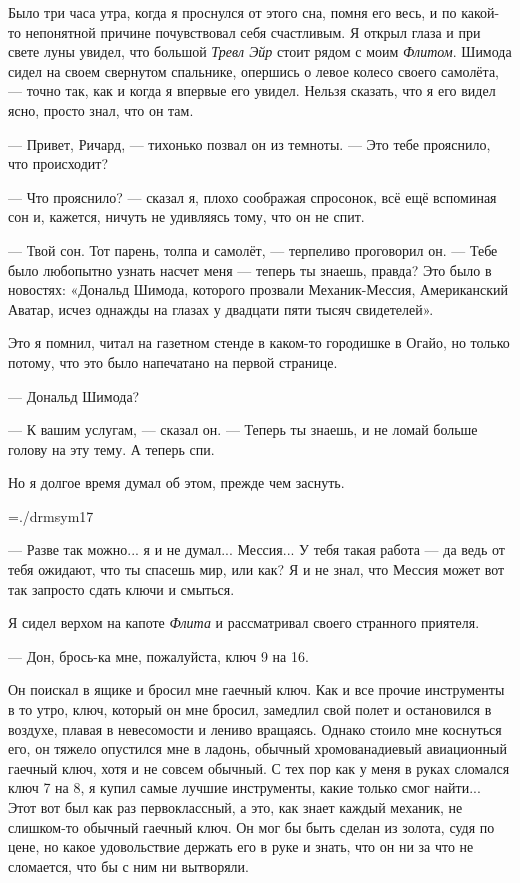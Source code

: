 Было три часа утра, когда я проснулся от этого сна, помня его весь, и по какой-то непонятной
причине почувствовал себя счастливым. Я открыл глаза и при свете луны увидел, что большой
{\it Тревл Эйр\/} стоит рядом с моим {\it Флитом}. Шимода сидел на своем свернутом спальнике, опершись о левое колесо своего самолёта, --- точно так, как и когда я впервые его увидел. Нельзя сказать, что я его видел ясно, просто знал, что он там.

--- Привет, Ричард, --- тихонько позвал он из темноты. --- Это тебе прояснило, что происходит?

--- Что прояснило? --- сказал я, плохо соображая спросонок, всё ещё вспоминая сон и, кажется, ничуть не удивляясь тому, что он не спит.

--- Твой сон. Тот парень, толпа и самолёт, --- терпеливо проговорил он. --- Тебе было любопытно узнать насчет меня --- теперь ты знаешь, правда? Это было в новостях: «Дональд Шимода, которого прозвали Механик-Мессия, Американский Аватар, исчез однажды на глазах у двадцати пяти тысяч свидетелей».

Это я помнил, читал на газетном стенде в каком-то городишке в Огайо, но только потому, что это было напечатано на первой странице.

--- Дональд Шимода?

--- К вашим услугам, --- сказал он. --- Теперь ты знаешь, и не ломай больше голову на эту тему. А теперь спи.

Но я долгое время думал об этом, прежде чем заснуть.

\vskip15pt
\hbox{\kern5cm\font\sym=./drmsym17 \sym {}}
\vskip10pt

--- Разве так можно... я и не думал... Мессия... У тебя такая работа --- да ведь от тебя ожидают, что ты спасешь мир, или как? Я и не знал, что Мессия может вот так запросто сдать ключи и смыться.

Я сидел верхом на капоте {\it Флита\/} и рассматривал своего странного приятеля.

--- Дон, брось-ка мне, пожалуйста, ключ 9 на 16.

Он поискал в ящике и бросил мне гаечный ключ. Как и все прочие инструменты в то утро, ключ, который он мне бросил, замедлил свой полет и остановился в воздухе, плавая в невесомости и лениво вращаясь. Однако стоило мне коснуться его, он тяжело опустился мне в ладонь, обычный хромованадиевый авиационный гаечный ключ, хотя и не совсем обычный. С тех пор как у меня в руках сломался ключ 7 на 8, я купил самые лучшие инструменты, какие только смог найти... Этот вот был как раз первоклассный, а это, как знает каждый механик, не слишком-то обычный гаечный ключ. Он мог бы быть сделан из золота, судя по цене, но какое удовольствие держать его в руке и знать, что он ни за что не сломается, что бы с ним ни вытворяли.

